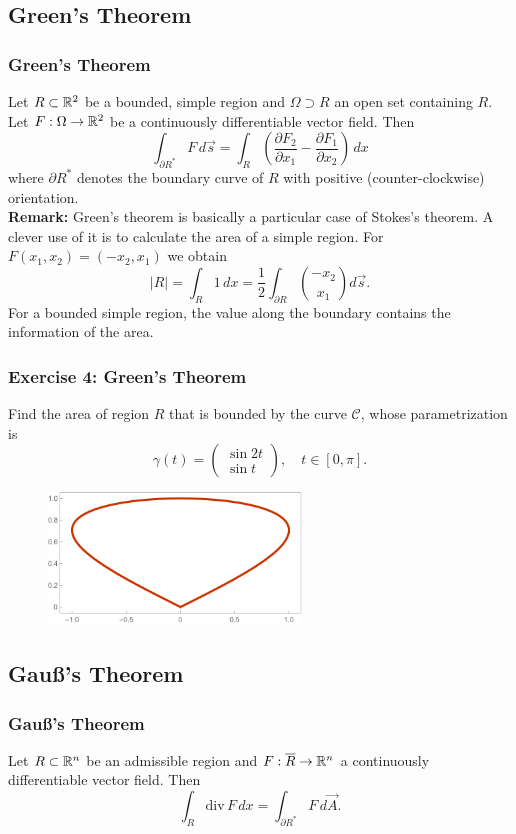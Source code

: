 \documentclass[11pt, t]{beamer}
\newcommand{\Remark}{\textbf{Remark: }}
\begin{document}
\subsection{Green's Theorem}
\begin{frame}
    \frametitle{Green's Theorem}
    Let $R\subset\mathbb{R}^2$ be a bounded, simple region and $\Omega\supset R$ an open set containing $R$. Let $F:\Omega\to\mathbb{R}^2$ be a continuously dif{}ferentiable vector field. Then
    \setcounter{equation}{0}
    \begin{equation*}\label{3.4.1}
        \int_{\partial R^*}F\,d\vec{s}=\int_R\left(\frac{\partial F_2}{\partial x_1}-\frac{\partial F_1}{\partial x_2}\right)\,dx
    \end{equation*}
    where $\partial R^*$ denotes the boundary curve of $R$ with positive
    (counter-clockwise) orientation.\\[9pt]

    \Remark Green's theorem is basically a particular case of Stokes's theorem. A clever use of it is to calculate the area of a simple region. For $F(x_1,x_2)=(-x_2,x_1)$ we obtain
    \[|R|=\int_R1\,dx=\frac{1}{2}\int_{\partial R}\binom{-x_2}{x_1}d\vec{s}.\]
    For a bounded simple region, the value along the boundary contains the information of the area.
\end{frame}

\begin{frame}
    \frametitle{Exercise 4: Green's Theorem}
    Find the area of region $R$ that is bounded by the curve $\mathcal{C}$, whose parametrization is %
    $$\gamma(t)=\begin{pmatrix}
            \sin 2t \\\sin t
        \end{pmatrix},\quad t\in[0,\pi].$$
    \begin{figure}[H]
        \centering
        \includegraphics[width=0.6\textwidth]{Figures/p1.pdf}
    \end{figure}
\end{frame}

\subsection{Gau\ss's Theorem}
\begin{frame}
    \frametitle{Gau\ss's Theorem}
    Let $R\subset\mathbb{R}^n$ be an admissible region and $F:\overline{R}\to\mathbb{R}^n$ a continuously dif{}ferentiable vector field. Then
    \[\int_R\text{div}\,F\,dx=\int_{\partial R^*}F\,d\vec{A}.\]
\end{frame}
\end{document}
